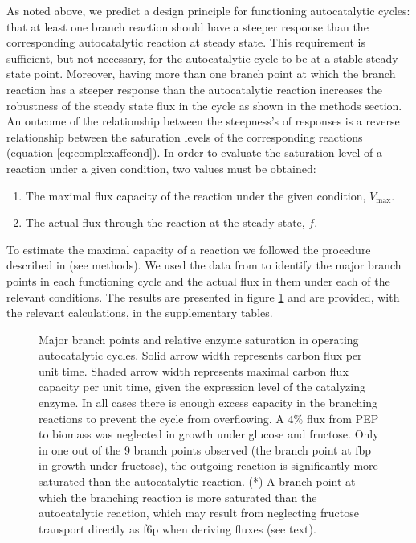     As noted above, we predict a design principle for functioning autocatalytic cycles: that at least one branch reaction should have a steeper response than the corresponding autocatalytic reaction at steady state.
    This requirement is sufficient, but not necessary, for the autocatalytic cycle to be at a stable steady state point.
    Moreover, having more than one branch point at which the branch reaction has a steeper response than the autocatalytic reaction increases the robustness of the steady state flux in the cycle as shown in the methods section.
    An outcome of the relationship between the steepness's of responses is a reverse relationship between the saturation levels of the corresponding reactions (equation \ref{eq:complexaffcond}).
    In order to evaluate the saturation level of a reaction under a given condition, two values must be obtained:
    \begin{enumerate}
      \item The maximal flux capacity of the reaction under the given condition, $V_{\max}$.
        \item The actual flux through the reaction at the steady state, $f$.
    \end{enumerate}

    To estimate the maximal capacity of a reaction we followed the procedure described in \cite{Davidi2016-ga} (see methods).
    We used the data from \cite{Gerosa2015-oq} to identify the major branch points in each functioning cycle and the actual flux in them under each of the relevant conditions.
    The results are presented in figure \ref{fig:branch} and are provided, with the relevant calculations, in the supplementary tables.

\begin{figure}[!htb]
\centering
\resizebox{1\linewidth}{!}{
    
}
\caption{
  Major branch points and relative enzyme saturation in operating autocatalytic cycles.
  Solid arrow width represents carbon flux per unit time.
  Shaded arrow width represents maximal carbon flux capacity per unit time, given the expression level of the catalyzing enzyme.
  In all cases there is enough excess capacity in the branching reactions to prevent the cycle from overflowing.
  A $4\%$ flux from PEP to biomass was neglected in growth under glucose and fructose.
  Only in one out of the 9 branch points observed (the branch point at fbp in growth under fructose), the outgoing reaction is significantly more saturated than the autocatalytic reaction.
  (*) A branch point at which the branching reaction is more saturated than the autocatalytic reaction, which may result from neglecting fructose transport directly as f6p when deriving fluxes (see text).
}
    \label{fig:branch}
\end{figure}

